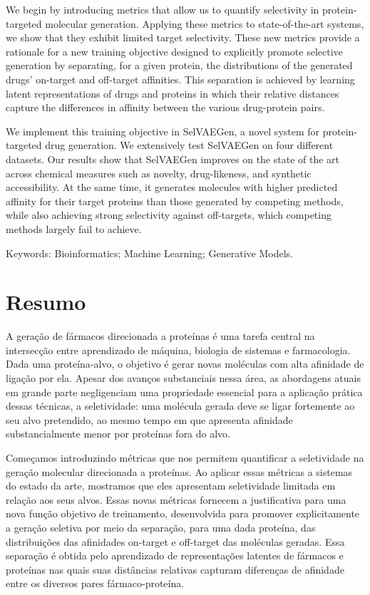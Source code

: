 \documentclass[a4paper,12pt]{article}
\begin{document}
We begin by introducing metrics that allow us to quantify selectivity in protein-targeted molecular generation. Applying these metrics to state-of-the-art systems, we show that they exhibit limited target selectivity. These new metrics provide a rationale for a new training objective designed to explicitly promote selective generation by separating, for a given protein, the distributions of the generated drugs' on-target and off-target affinities. This separation is achieved by learning latent representations of drugs and proteins in which their relative distances capture the differences in affinity between the various drug-protein pairs.

We implement this training objective in SelVAEGen, a novel system for protein-targeted drug generation. We extensively test SelVAEGen on four different datasets. Our results show that SelVAEGen improves on the state of the art across chemical measures such as novelty, drug-likeness, and synthetic accessibility. At the same time, it generates molecules with higher predicted affinity for their target proteins than those generated by competing methods, while also achieving strong selectivity against off-targets, which competing methods largely fail to achieve.

Keywords: Bioinformatics; Machine Learning; Generative Models.
\thispagestyle{empty}

\newpage
\section*{Resumo}
A geração de fármacos direcionada a proteínas é uma tarefa central na intersecção entre aprendizado de máquina, biologia de sistemas e farmacologia. Dada uma proteína-alvo, o objetivo é gerar novas moléculas com alta afinidade de ligação por ela. Apesar dos avanços substanciais nessa área, as abordagens atuais em grande parte negligenciam uma propriedade essencial para a aplicação prática dessas técnicas, a seletividade: uma molécula gerada deve se ligar fortemente ao seu alvo pretendido, ao mesmo tempo em que apresenta afinidade substancialmente menor por proteínas fora do alvo.

Começamos introduzindo métricas que nos permitem quantificar a seletividade na geração molecular direcionada a proteínas. Ao aplicar essas métricas a sistemas do estado da arte, mostramos que eles apresentam seletividade limitada em relação aos seus alvos. Essas novas métricas fornecem a justificativa para uma nova função objetivo de treinamento, desenvolvida para promover explicitamente a geração seletiva por meio da separação, para uma dada proteína, das distribuições das afinidades on-target e off-target das moléculas geradas. Essa separação é obtida pelo aprendizado de representações latentes de fármacos e proteínas nas quais suas distâncias relativas capturam diferenças de afinidade entre os diversos pares fármaco-proteína.
\end{document}
